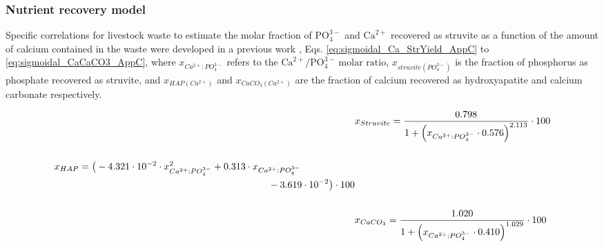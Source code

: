 \begin{refsection}[referencesCh4]
\subsubsection{Nutrient recovery model}\label{section:NutrienModelAppC}
Specific correlations for livestock waste to estimate the molar fraction of $\text{PO}_{4}^{3-}$ and $\text{Ca}^{2+}$ recovered as struvite as a function of the amount of calcium contained in the waste were developed in a previous work \citep{MartinStruvite}, Eqs. \ref{eq:sigmoidal_Ca_StrYield_AppC} to \ref{eq:sigmoidal_CaCaCO3_AppC}, where $x_{Ca^{2+}:PO_{4}^{3-}}$ refers to the $\text{Ca}^{2+}/\text{PO}_{4}^{3-} \ \text{molar ratio}$, $x_{struvite \left(PO_{4}^{3-}\right) }$ is the fraction of phosphorus as phosphate recovered as struvite, and $x_{HAP \left(Ca^{2+}\right)}$ and $x_{CaCO_{3} \left(Ca^{2+}\right)}$ are the fraction of calcium recovered as hydroxyapatite and calcium carbonate respectively.

\begin{align}
&x_{Struvite}= \frac{0.798}{1+\left(x_{Ca^{2+}:PO_{4}^{3-}} \cdot 0.576\right)^{2.113}} \cdot 100 \label{eq:sigmoidal_Ca_StrYield_AppC} \\
\nonumber \\
\begin{split}
& x_{HAP} =\big(-4.321 \cdot 10^{-2} \cdot x_{Ca^{2+}:PO_{4}^{3-}}^{2} + 0.313 \cdot x_{Ca^{2+}:PO_{4}^{3-}} \\& \hspace{7.8cm} - 3.619 \cdot 10^{-2} \big) \cdot 100 \label{eq:sigmoidal_Ca_HAP_AppC}
\end{split}
\\
\nonumber \\
&  x_{CaCO_{3}} = \frac{1.020}{1+\left(x_{Ca^{2+}:PO_{4}^{3-}} \cdot 0.410 \right)^{1.029}} \cdot 100 \label{eq:sigmoidal_CaCaCO3_AppC}
\end{align}


\end{refsection}
